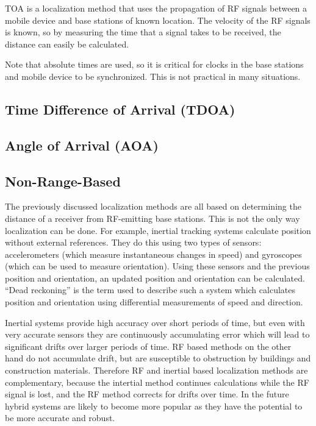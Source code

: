 TOA is a localization method that uses the propagation of RF signals between a mobile device and base stations of known location. The velocity of the RF signals is known, so by measuring the time that a signal takes to be received, the distance can easily be calculated. 

Note that absolute times are used, so it is critical for clocks in the base stations and mobile device to be synchronized. This is not practical in many situations.

\subsection{Time Difference of Arrival (TDOA)}

\subsection{Angle of Arrival (AOA)}

\subsection{Non-Range-Based}

The previously discussed localization methods are all based on determining the distance of a receiver from RF-emitting base stations. This is not the only way localization can be done. For example, inertial tracking systems calculate position without external references. They do this using two types of sensors: accelerometers (which measure instantaneous changes in speed) and gyroscopes (which can be used to measure orientation). Using these sensors and the previous position and orientation, an updated position and orientation can be calculated. ``Dead reckoning'' is the term used to describe such a system which calculates position and orientation using differential measurements of speed and direction.

Inertial systems provide high accuracy over short periods of time, but even with very accurate sensors they are continuously accumulating error which will lead to significant drifts over larger periods of time. RF based methods on the other hand do not accumulate drift, but are susceptible to obstruction by buildings and construction materials. Therefore RF and inertial based localization methods are complementary, because the intertial method continues calculations while the RF signal is lost, and the RF method corrects for drifts over time. In the future hybrid systems are likely to become more popular as they have the potential to be more accurate and robust.

